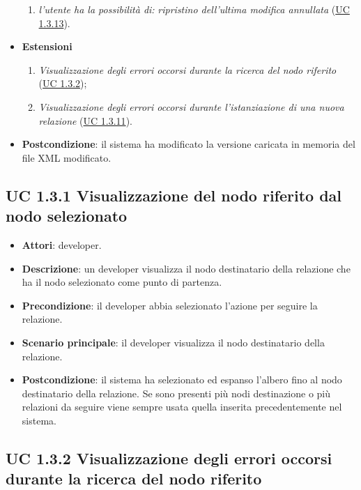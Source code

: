 \begin{itemize}
\begin{enumerate}
				\item \textit{l'utente ha la possibilità di:} \textit{ripristino dell'ultima modifica annullata} (\hyperref[subsec:XEUC1.3.13]{UC 1.3.13}).
				
			\end{enumerate}
			\item \textbf{Estensioni}
			\begin{enumerate}
				\item\textit{Visualizzazione degli errori occorsi durante la ricerca del nodo riferito} (\hyperref[subsec:XEUC1.3.2]{UC 1.3.2});
				
				\item\textit{Visualizzazione degli errori occorsi durante l'istanziazione di una nuova relazione} (\hyperref[subsec:XEUC1.16]{UC 1.3.11}).
			\end{enumerate}
			\item\textbf{Postcondizione}: il sistema ha modificato la versione caricata in memoria del file XML modificato.
		\end{itemize}
		
	\subsection{UC 1.3.1 Visualizzazione del nodo riferito dal nodo selezionato}
		\label{subsec:XEUC1.3.1}
		
		\begin{itemize}
			\item\textbf{Attori}: developer.
			\item\textbf{Descrizione}: un developer visualizza il nodo destinatario della relazione che ha il nodo selezionato come punto di partenza.
			\item\textbf{Precondizione}: il developer abbia selezionato l'azione per seguire la relazione.
			\item\textbf{Scenario principale}: il developer visualizza il nodo destinatario della relazione.
			\item\textbf{Postcondizione}: il sistema ha selezionato ed espanso l'albero fino al nodo destinatario della relazione. Se sono presenti più nodi destinazione o più relazioni da seguire viene sempre usata quella inserita precedentemente nel sistema.
		\end{itemize}
		
	\subsection{UC 1.3.2 Visualizzazione degli errori occorsi durante la ricerca del nodo riferito}
		\label{subsec:XEUC1.3.2}
		
